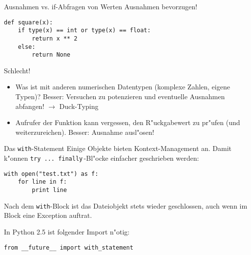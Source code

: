 \begin{frame}[fragile]{Ausnahmen vs. if-Abfragen von Werten}
Ausnahmen bevorzugen!

\begin{lstlisting}
def square(x):
    if type(x) == int or type(x) == float:
        return x ** 2
    else:
        return None
\end{lstlisting}
Schlecht!

\begin{itemize}
  \item Was ist mit anderen numerischen Datentypen (komplexe Zahlen, eigene Typen)? Besser: Versuchen zu potenzieren und eventuelle Ausnahmen abfangen! $\rightarrow$ \alert{Duck-Typing}

  \item Aufrufer der Funktion kann vergessen, den R"uckgabewert zu pr"ufen (und weiterzureichen). Besser: Ausnahme ausl"osen!
\end{itemize}
\end{frame}


\begin{frame}[fragile]{Das \texttt{with}-Statement}
Einige Objekte bieten Kontext-Management an. Damit k"onnen \lstinline{try ... finally}\,-Bl"ocke einfacher geschrieben werden:
\begin{lstlisting}
with open("test.txt") as f:
    for line in f:
        print line
\end{lstlisting}
Nach dem \lstinline{with}-Block ist das Dateiobjekt stets wieder geschlossen, auch wenn im Block eine Exception auftrat.\vspace{5mm}

In Python 2.5 ist folgender Import n"otig:
\begin{lstlisting}
from __future__ import with_statement
\end{lstlisting}
\end{frame}
